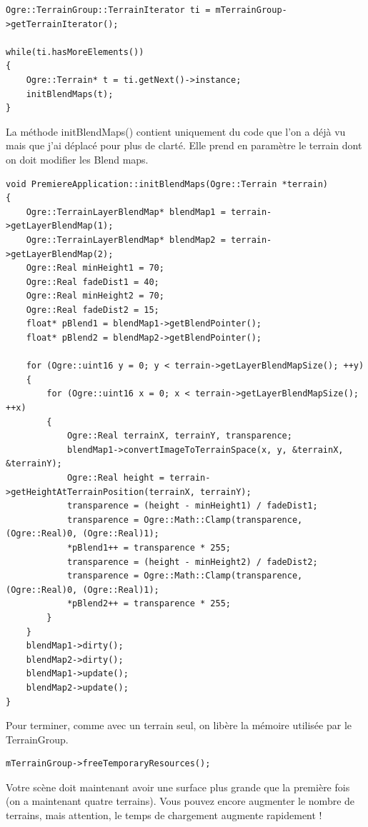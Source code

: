 \documentclass[10pt,a4paper]{report}
\begin{document}
\begin{lstlisting}[caption={}]
Ogre::TerrainGroup::TerrainIterator ti = mTerrainGroup->getTerrainIterator();

while(ti.hasMoreElements())
{
    Ogre::Terrain* t = ti.getNext()->instance;
    initBlendMaps(t);
}
\end{lstlisting}

La m\'ethode initBlendMaps() contient uniquement du code que l'on a d\'ej\`a vu mais que j'ai d\'eplac\'e pour plus de clart\'e. Elle prend en param\`etre le terrain dont on doit modifier les Blend maps.

\begin{lstlisting}[caption={}]
void PremiereApplication::initBlendMaps(Ogre::Terrain *terrain)
{
    Ogre::TerrainLayerBlendMap* blendMap1 = terrain->getLayerBlendMap(1);
    Ogre::TerrainLayerBlendMap* blendMap2 = terrain->getLayerBlendMap(2);
    Ogre::Real minHeight1 = 70;
    Ogre::Real fadeDist1 = 40;
    Ogre::Real minHeight2 = 70;
    Ogre::Real fadeDist2 = 15;
    float* pBlend1 = blendMap1->getBlendPointer();
    float* pBlend2 = blendMap2->getBlendPointer();

    for (Ogre::uint16 y = 0; y < terrain->getLayerBlendMapSize(); ++y)
    {
        for (Ogre::uint16 x = 0; x < terrain->getLayerBlendMapSize(); ++x)
        {
            Ogre::Real terrainX, terrainY, transparence;
            blendMap1->convertImageToTerrainSpace(x, y, &terrainX, &terrainY);
            Ogre::Real height = terrain->getHeightAtTerrainPosition(terrainX, terrainY);
            transparence = (height - minHeight1) / fadeDist1;
            transparence = Ogre::Math::Clamp(transparence, (Ogre::Real)0, (Ogre::Real)1);
            *pBlend1++ = transparence * 255;
            transparence = (height - minHeight2) / fadeDist2;
            transparence = Ogre::Math::Clamp(transparence, (Ogre::Real)0, (Ogre::Real)1);
            *pBlend2++ = transparence * 255;
        }
    }
    blendMap1->dirty();
    blendMap2->dirty();
    blendMap1->update();
    blendMap2->update();
}
\end{lstlisting}

Pour terminer, comme avec un terrain seul, on lib\`ere la m\'emoire utilis\'ee par le TerrainGroup.

\begin{lstlisting}[caption={}]
mTerrainGroup->freeTemporaryResources();
\end{lstlisting}

Votre sc\`ene doit maintenant avoir une surface plus grande que la première fois (on a maintenant quatre terrains). Vous pouvez encore augmenter le nombre de terrains, mais attention, le temps de chargement augmente rapidement !
\end{document}
